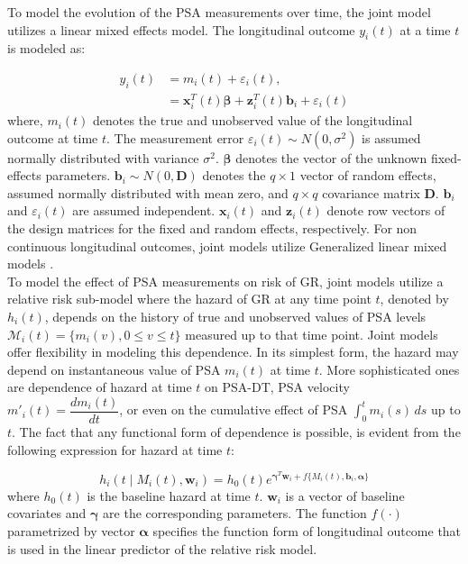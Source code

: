 To model the evolution of the PSA measurements over time,  the joint model utilizes a linear mixed effects model. The longitudinal outcome $y_i(t)$ at a time $t$ is modeled as:

\begin{equation*}
\begin{split}
y_i(t) &= m_i(t) + \varepsilon_i(t), \\
&= \boldsymbol{x}_i^T(t) \boldsymbol{\beta} + \boldsymbol{z}_i^T(t) \boldsymbol{b}_i + \varepsilon_i(t)
\end{split}
\end{equation*}
where, $m_i(t)$ denotes the true and unobserved value of the longitudinal outcome at time $t$. The measurement error $\varepsilon_i(t) \sim N(0, \sigma^2)$ is assumed normally distributed with variance $\sigma^2$. $\boldsymbol{\beta}$ denotes the vector of the unknown fixed-effects parameters. $\boldsymbol{b}_i \sim N(0, \boldsymbol{D})$ denotes the $q \times 1$ vector of random effects, assumed normally distributed with mean zero, and $q \times q$ covariance matrix $\boldsymbol{D}$. $\boldsymbol{b}_i$ and $\varepsilon_i(t)$ are assumed independent. $\boldsymbol{x}_i(t)$ and $\boldsymbol{z}_i(t)$ denote row vectors of the design matrices for the fixed and random effects, respectively. For non continuous longitudinal outcomes, joint models utilize Generalized linear mixed models \citep{rizopoulos2012joint}.\\

To model the effect of PSA measurements on risk of GR, joint models utilize a relative risk sub-model where the hazard of GR at any time point $t$, denoted by $h_i(t)$, depends on the history of true and unobserved values of PSA levels $\mathcal{M}_i(t) = \{m_i(v), 0\leq v \leq t\}$ measured up to that time point. Joint models offer flexibility in modeling this dependence. In its simplest form, the hazard may depend on instantaneous value of PSA $m_i(t)$ at time $t$. More sophisticated ones are dependence of hazard at time $t$ on PSA-DT, PSA velocity $m'_i(t) = \dfrac{d m_i(t)}{dt}$, or even on the cumulative effect of PSA $\int_0^t m_i(s) \,ds$ up to $t$. The fact that any functional form of dependence is possible, is evident from the following expression for hazard at time $t$:

\begin{equation*}
h_i(t \mid M_i(t), \boldsymbol{w}_i) = h_0(t) e^{\boldsymbol{\gamma}^T\boldsymbol{w}_i + f\{M_i(t), \boldsymbol{b}_i, \boldsymbol{\alpha}\}}
\end{equation*}
where $h_0(t)$ is the baseline hazard at time $t$. $\boldsymbol{w}_i$ is a vector of baseline covariates and $\boldsymbol{\gamma}$ are the corresponding parameters. The function $f(\cdot)$ parametrized by vector $\boldsymbol{\alpha}$ specifies the function form of longitudinal outcome that is used in the linear predictor of the relative risk model.\\

